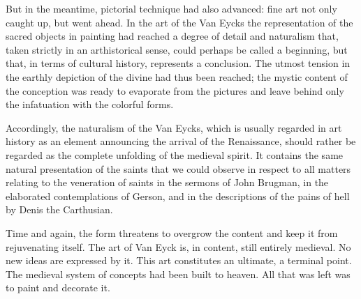 \protect\hypertarget{20_ILLUSTRATIONS_FOLLOW_PAGE.xhtmlux5cux23page_319}{}{}But
in the meantime, pictorial technique had also advanced: fine art not
only caught up, but went ahead. In the art of the Van Eycks the
representation of the sacred objects in painting had reached a degree of
detail and naturalism that, taken strictly in an arthistorical sense,
could perhaps be called a beginning, but that, in terms of cultural
history, represents a conclusion. The utmost tension in the earthly
depiction of the divine had thus been reached; the mystic content of the
conception was ready to evaporate from the pictures and leave behind
only the infatuation with the colorful forms.

Accordingly, the naturalism of the Van Eycks, which is usually regarded
in art history as an element announcing the arrival of the Renaissance,
should rather be regarded as the complete unfolding of the medieval
spirit. It contains the same natural presentation of the saints that we
could observe in respect to all matters relating to the veneration of
saints in the sermons of John Brugman, in the elaborated contemplations
of Gerson, and in the descriptions of the pains of hell by Denis the
Carthusian.

Time and again, the form threatens to overgrow the content and keep it
from rejuvenating itself. The art of Van Eyck is, in content, still
entirely medieval. No new ideas are expressed by it. This art
constitutes an ultimate, a terminal point. The medieval system of
concepts had been built to heaven. All that was left was to paint and
decorate it.

